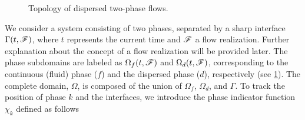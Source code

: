 \begin{figure}[h!]
    \centering
    \caption{Topology of dispersed two-phase flows.}%
    \label{fig:Scheme}
\end{figure}

We consider a system consisting of two phases, separated by a sharp interface $\Gamma(t,\mathscr{F})$,
where $t$ represents the current time and $\mathscr{F}$ a flow realization. %
Further explanation about the concept of a flow realization will be provided later. 
The phase subdomains are labeled as $\Omega_f(t,\mathscr{F})$ and $\Omega_d(t,\mathscr{F})$, corresponding to the continuous (fluid) phase ($f$) and the dispersed phase ($d$), respectively (see \ref{fig:Scheme}). 
The complete domain, $\Omega$, is composed of the union of $\Omega_f$, $\Omega_d$, and $\Gamma$. To track the position of phase $k$ and the interfaces, we introduce the phase indicator function $\chi_k$ defined as follows

